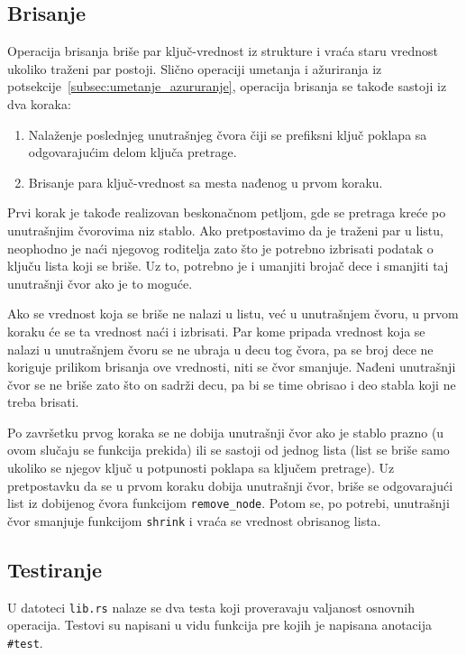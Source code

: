 \documentclass[12pt,oneside]{memoir}
\begin{document}
\subsection{Brisanje}
Operacija brisanja briše par ključ-vrednost iz strukture
i vraća staru vrednost ukoliko traženi par postoji.
Slično operaciji umetanja i ažuriranja iz
potsekcije~\ref{subsec:umetanje_azururanje}, operacija brisanja se
takođe sastoji iz dva koraka:

\begin{enumerate}
  \item Nalaženje poslednjeg unutrašnjeg čvora čiji se prefiksni ključ
        poklapa sa odgovarajućim delom ključa pretrage.
  \item Brisanje para ključ-vrednost sa mesta nađenog u prvom koraku.
\end{enumerate}

Prvi korak je takođe realizovan beskonačnom petljom, gde se pretraga
kreće po unutrašnjim čvorovima niz stablo. Ako pretpostavimo da je
traženi par u listu, neophodno je naći njegovog roditelja zato što
je potrebno izbrisati podatak o ključu lista koji se briše.
Uz to, potrebno je i umanjiti brojač dece i smanjiti taj
unutrašnji čvor ako je to moguće.

Ako se vrednost koja se briše
ne nalazi u listu, već u unutrašnjem čvoru, u prvom koraku
će se ta vrednost naći i izbrisati.
Par kome pripada vrednost koja se nalazi u unutrašnjem čvoru
se ne ubraja u decu tog čvora,
pa se broj dece ne koriguje prilikom brisanja ove vrednosti, niti
se čvor smanjuje.
Nađeni unutrašnji čvor se ne briše zato što on sadrži
decu, pa bi se time obrisao i deo stabla koji ne treba
brisati.

Po završetku prvog koraka se ne dobija unutrašnji čvor ako je
stablo prazno (u ovom slučaju se funkcija prekida) ili se
sastoji od jednog lista (list se briše samo ukoliko se njegov ključ
u potpunosti poklapa sa ključem pretrage). Uz pretpostavku da se u prvom
koraku dobija unutrašnji čvor, briše se odgovarajući list iz dobijenog
čvora funkcijom \texttt{remove\_node}. Potom se, po potrebi,
unutrašnji čvor smanjuje funkcijom \texttt{shrink}
i vraća se vrednost obrisanog lista.

\subsection{Testiranje}
U datoteci \texttt{lib.rs} nalaze se dva testa koji proveravaju
valjanost osnovnih operacija. Testovi su napisani u vidu funkcija
pre kojih je napisana anotacija \texttt{\#\lbrack test\rbrack}.
\end{document}
